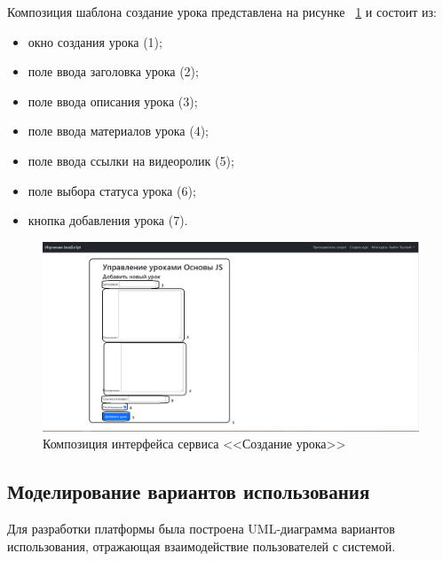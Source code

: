 Композиция шаблона создание урока представлена на рисунке ~\ref{templ:image10} и состоит из:

\begin{itemize}
	\item окно создания урока (1);
	\item поле ввода заголовка урока (2);
	\item поле ввода описания урока (3);
	\item поле ввода материалов урока (4);
	\item поле ввода ссылки на видеоролик (5);
	\item поле выбора статуса урока (6);
	\item кнопка добавления урока (7).
\end{itemize}

\begin{figure}[h]
	\centering
	\includegraphics[width=1\linewidth]{images/создатьурок}
	\caption{Композиция интерфейса сервиса <<Создание урока>>}
	\label{templ:image10}
\end{figure}

\clearpage
\subsection{Моделирование вариантов использования}

Для разработки платформы была построена UML-диаграмма вариантов использования, отражающая взаимодействие пользователей с системой.

